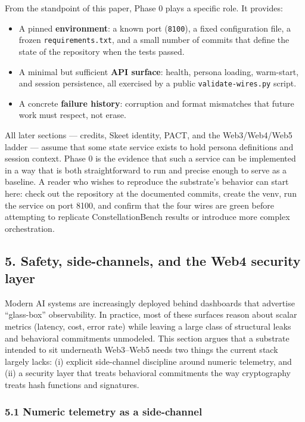From the standpoint of this paper, Phase 0 plays a specific role. It
provides:

\begin{itemize}
\tightlist
\item
  A pinned \textbf{environment}: a known port (\texttt{8100}), a fixed
  configuration file, a frozen \texttt{requirements.txt}, and a small
  number of commits that define the state of the repository when the
  tests passed.
\item
  A minimal but sufficient \textbf{API surface}: health, persona
  loading, warm-start, and session persistence, all exercised by a
  public \texttt{validate-wires.py} script.
\item
  A concrete \textbf{failure history}: corruption and format mismatches
  that future work must respect, not erase.
\end{itemize}

All later sections --- credits, Skeet identity, PACT, and the
Web3/Web4/Web5 ladder --- assume that some state service exists to hold
persona definitions and session context. Phase 0 is the evidence that
such a service can be implemented in a way that is both straightforward
to run and precise enough to serve as a baseline. A reader who wishes to
reproduce the substrate's behavior can start here: check out the
repository at the documented commits, create the venv, run the service
on port 8100, and confirm that the four wires are green before
attempting to replicate ConstellationBench results or introduce more
complex orchestration.

\subsection{5. Safety, side-channels, and the Web4 security
layer}\label{safety-side-channels-and-the-web4-security-layer}

Modern AI systems are increasingly deployed behind dashboards that
advertise ``glass-box'' observability. In practice, most of these
surfaces reason about scalar metrics (latency, cost, error rate) while
leaving a large class of structural leaks and behavioral commitments
unmodeled. This section argues that a substrate intended to sit
underneath Web3--Web5 needs two things the current stack largely lacks:
(i) explicit side-channel discipline around numeric telemetry, and (ii)
a security layer that treats behavioral commitments the way cryptography
treats hash functions and signatures.

\subsubsection{5.1 Numeric telemetry as a
side-channel}\label{numeric-telemetry-as-a-side-channel}


